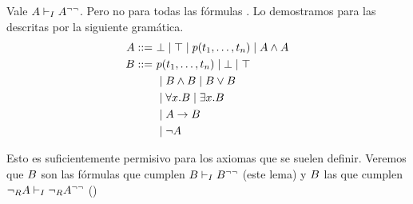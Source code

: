 \begin{lemma}
    \label{fri:lemma:trans-intro}
    Vale $A \vdash_I A^{\neg\neg}$. Pero no para todas las fórmulas \cite{selinger-friedman}. Lo demostramos para las descritas por la siguiente gramática.
    \begin{align*}
        A ::=\     & \bot \mid \top \mid p(t_1, \dots, t_n) \mid A \wedge A \\
        B ::=\  & p(t_1, \dots, t_n) \mid \bot \mid \top                        \\
                       & \mid B \wedge B \mid B \vee B                       \\
                       & \mid \forall x . B \mid \exists x . B                      \\
                       & \mid A \to B                                                      \\
                       & \mid \neg A
    \end{align*}

    Esto es suficientemente permisivo para los axiomas que se suelen definir. Veremos que $B$ son las fórmulas que cumplen $B \vdash_I B^{\neg\neg}$ (este lema) y $B$ las que cumplen $\neg_R A \vdash_I \neg_R A^{\neg\neg}$ () 
\end{lemma}
